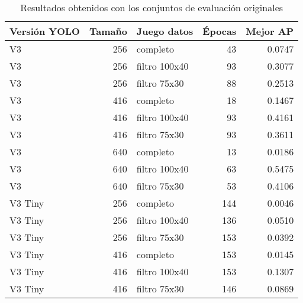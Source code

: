 \begin{table}[H]
	\centering
	\begin{tabular}{lrlrr}
		\toprule
		Versión YOLO &  Tamaño &    Juego datos &  Épocas &  Mejor AP \\
		\midrule
		V3      &     256 &       completo &      43 &    0.0747 \\
		V3      &     256 &  filtro 100x40 &      93 &    0.3077 \\
		V3      &     256 &   filtro 75x30 &      88 &    0.2513 \\
		V3      &     416 &       completo &      18 &    0.1467 \\
		V3      &     416 &  filtro 100x40 &      93 &    0.4161 \\
		V3      &     416 &   filtro 75x30 &      93 &    0.3611 \\
		V3      &     640 &       completo &      13 &    0.0186 \\
		V3      &     640 &  filtro 100x40 &      63 &    0.5475 \\
		V3      &     640 &   filtro 75x30 &      53 &    0.4106 \\
		V3 Tiny &     256 &       completo &     144 &    0.0046 \\
		V3 Tiny &     256 &  filtro 100x40 &     136 &    0.0510 \\
		V3 Tiny &     256 &   filtro 75x30 &     153 &    0.0392 \\
		V3 Tiny &     416 &       completo &     153 &    0.0145 \\
		V3 Tiny &     416 &  filtro 100x40 &     153 &    0.1307 \\
		V3 Tiny &     416 &   filtro 75x30 &     146 &    0.0869 \\
		\bottomrule
	\end{tabular}
	\caption{Resultados obtenidos con los conjuntos de evaluación originales}
	\label{tab:evaluationoriginal}
\end{table}

